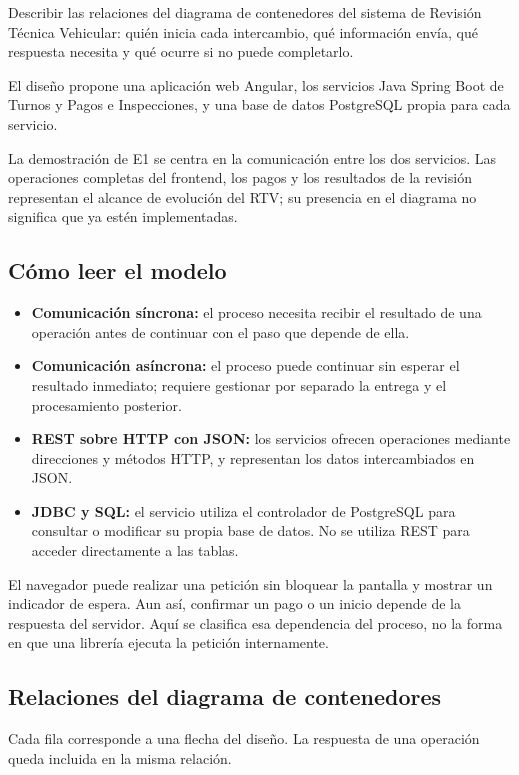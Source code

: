 \documentclass[11pt,a4paper]{article}
\begin{document}
Describir las relaciones del diagrama de contenedores del sistema de Revisión Técnica Vehicular: quién inicia cada intercambio, qué información envía, qué respuesta necesita y qué ocurre si no puede completarlo.

El diseño propone una aplicación web Angular, los servicios Java Spring Boot de Turnos y Pagos e Inspecciones, y una base de datos PostgreSQL propia para cada servicio.

La demostración de E1 se centra en la comunicación entre los dos servicios. Las operaciones completas del frontend, los pagos y los resultados de la revisión representan el alcance de evolución del RTV; su presencia en el diagrama no significa que ya estén implementadas.

\subsection{Cómo leer el modelo}

\begin{itemize}[nosep]
  \item \textbf{Comunicación síncrona:} el proceso necesita recibir el resultado de una operación antes de continuar con el paso que depende de ella.
  \item \textbf{Comunicación asíncrona:} el proceso puede continuar sin esperar el resultado inmediato; requiere gestionar por separado la entrega y el procesamiento posterior.
  \item \textbf{REST sobre HTTP con JSON:} los servicios ofrecen operaciones mediante direcciones y métodos HTTP, y representan los datos intercambiados en JSON.
  \item \textbf{JDBC y SQL:} el servicio utiliza el controlador de PostgreSQL para consultar o modificar su propia base de datos. No se utiliza REST para acceder directamente a las tablas.
\end{itemize}

El navegador puede realizar una petición sin bloquear la pantalla y mostrar un indicador de espera. Aun así, confirmar un pago o un inicio depende de la respuesta del servidor. Aquí se clasifica esa dependencia del proceso, no la forma en que una librería ejecuta la petición internamente.

\subsection{Relaciones del diagrama de contenedores}

Cada fila corresponde a una flecha del diseño. La respuesta de una operación queda incluida en la misma relación.
\end{document}
